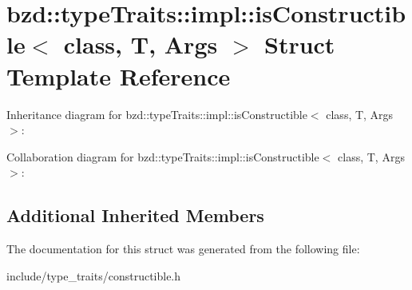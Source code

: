 \hypertarget{structbzd_1_1typeTraits_1_1impl_1_1isConstructible}{}\section{bzd\+:\+:type\+Traits\+:\+:impl\+:\+:is\+Constructible$<$ class, T, Args $>$ Struct Template Reference}
\label{structbzd_1_1typeTraits_1_1impl_1_1isConstructible}


Inheritance diagram for bzd\+:\+:type\+Traits\+:\+:impl\+:\+:is\+Constructible$<$ class, T, Args $>$\+:


Collaboration diagram for bzd\+:\+:type\+Traits\+:\+:impl\+:\+:is\+Constructible$<$ class, T, Args $>$\+:
\subsection*{Additional Inherited Members}


The documentation for this struct was generated from the following file\+:\begin{DoxyCompactItemize}
\item 
include/type\+\_\+traits/constructible.\+h\end{DoxyCompactItemize}
